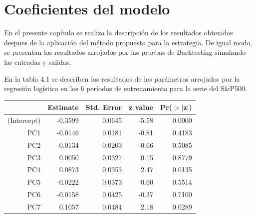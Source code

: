 \documentclass[a4paper,12pt]{Latex/Classes/PhDthesisPSnPDF}
\begin{document}


\newpage

\section{Coeficientes del modelo}

En el presente capítulo se realiza la descripción de los resultados obtenidos despues de la aplicación del método propuesto para la estrategia. De igual modo, se presentan los resultados arrojados por las pruebas de Backtesting simulando las entradas y salidas.

En la tabla 4.1 se describen los resultados de los parámetros arrojados por la regresión logística en los 6 períodos de entrenamiento para la serie del S\&P500.
\begin{center}
\begin{table}[ht]
\centering
\begin{tabular}{rrrrr}
  \hline
 & Estimate & Std. Error & z value & Pr($>$$|$z$|$) \\ 
  \hline
(Intercept) & -0.3599 & 0.0645 & -5.58 & 0.0000 \\ 
  PC1 & -0.0146 & 0.0181 & -0.81 & 0.4183 \\ 
  PC2 & -0.0134 & 0.0203 & -0.66 & 0.5085 \\ 
  PC3 & 0.0050 & 0.0327 & 0.15 & 0.8779 \\ 
  PC4 & 0.0873 & 0.0353 & 2.47 & 0.0135 \\ 
  PC5 & -0.0222 & 0.0373 & -0.60 & 0.5514 \\ 
  PC6 & -0.0158 & 0.0425 & -0.37 & 0.7100 \\ 
  PC7 & 0.1057 & 0.0484 & 2.18 & 0.0289 \\ 
   \hline
\end{tabular}
\end{table}\end{center}
\end{document}
